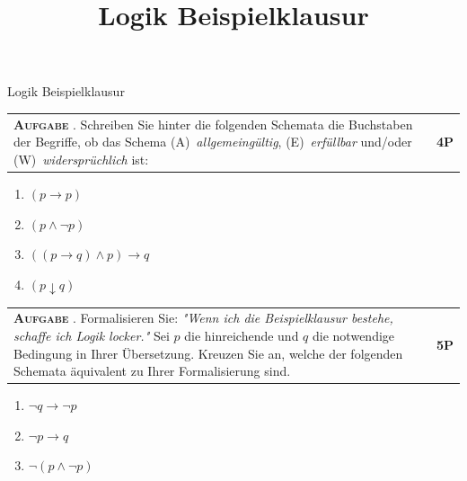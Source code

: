 \documentclass[a4paper,12pt]{article}
\title{Logik Beispielklausur}
\date{\thedate}
\makeatletter
\newcounter{ctasks}
\newcounter{cpoints}
\newcounter{ehtmppoints}
\newcounter{ehtpointsline}
\newcommand{\eh}[1]{{\bigskip\setcounter{ehtmppoints}{0}\footnotesize\iftoggle{NOTDEBUG}{}{\noindent\begin{tcolorbox}[size=title,right=1cm,enhanced,breakable,title=Erwartungshorizont Aufgabe \thectasks]
\everypar={\setcounter{ehtpointsline}{0}}

\noindent#1

\bigskip\noindent \textbf{Erreichbare Punkte: \theehtmppoints}
\smallskip\noindent\end{tcolorbox}}\normalsize}}
\newcommand*{\point}{\stepcounter{ehtmppoints}\marginnote{\advance\leftskip-1.2cm\ensuremath{\bigstar}}}
\newcommand{\task}[4]{\stepcounter{ctasks}\bigskip\noindent
\begin{tabular}{@{}p{14.2cm} >{\raggedleft\arraybackslash}p{1cm}@{}}
  \begin{minipage}[t]{14.2cm}
    \textbf{\textsc{#4 \thectasks}}. #1
  \end{minipage}
  & \textbf{#2P}
\end{tabular}
\nopagebreak
#3}
\newcommand{\newtask}[3]{\addtocounter{cpoints}{#2}\task{#1}{#2}{#3}{Aufgabe}}
\newcommand{\printlines}[1]{\normalsize\iftoggle{NOTDEBUG}{\begin{flushleft}\begin{longtable}[t]{@{}p{15.8cm}@{}}\directlua{
        for i=0,#1 do
            tex.print("\\medskip \\\\ \\hline")
        end
    }\end{longtable}\end{flushleft}}{}\normalsize}
\makeatother
\begin{document}
\begin{center}
    \Large Logik Beispielklausur
\end{center}

\newtask{Schreiben Sie hinter die folgenden Schemata die Buchstaben der Begriffe, ob das Schema \mbox{(A) \textit{allgemeingültig}}, \mbox{(E) \textit{erfüllbar}} und/oder \mbox{(W) \textit{widersprüchlich}} ist:}{4}{

\begin{enumerate}[label=\arabic*.,align=right]
    \item $(p \rightarrow p)$
    \item $(p \wedge \lnot p)$
    \item $((p \rightarrow q) \wedge p) \rightarrow q$
    \item $(p \downarrow q)$
\end{enumerate}

\eh{\begin{enumerate}[label=\arabic*.,align=right]
    \item \point (A), (E)
    \item \point (W)
    \item \point (A), (E)
    \item \point (E)
\end{enumerate}
}}

\newtask{Formalisieren Sie: \textit{"Wenn ich die Beispielklausur bestehe, schaffe ich Logik locker."}  Sei $p$ die hinreichende und $q$ die notwendige Bedingung in Ihrer Übersetzung. Kreuzen Sie an, welche der folgenden Schemata äquivalent zu Ihrer Formalisierung sind.}{5}{

\begin{enumerate}[align=center,label={$\bigcirc$}]
    \item $\lnot q \rightarrow \lnot p$
    \item $\lnot p \rightarrow q$
    \item $\lnot (p \wedge \lnot p)$
\end{enumerate}

\printlines{5}

\eh{Mögliche Formalisierung:

\bigskip\point p := "Ich bestehe die Beispielklausur."

q := "Ich schaffe Logik locker."

\point $p \rightarrow q$

\bigskip
Je nach Formalisierung entweder nichts oder ...

\begin{enumerate}[align=center,label={$\bigcirc$}]
    \item[\otimes] \point $\lnot q \rightarrow \lnot p$
    \item \point $\lnot p \rightarrow q$
    \item[\otimes] \point $\lnot (p \wedge \lnot p)$
\end{enumerate}}
}
\end{document}
